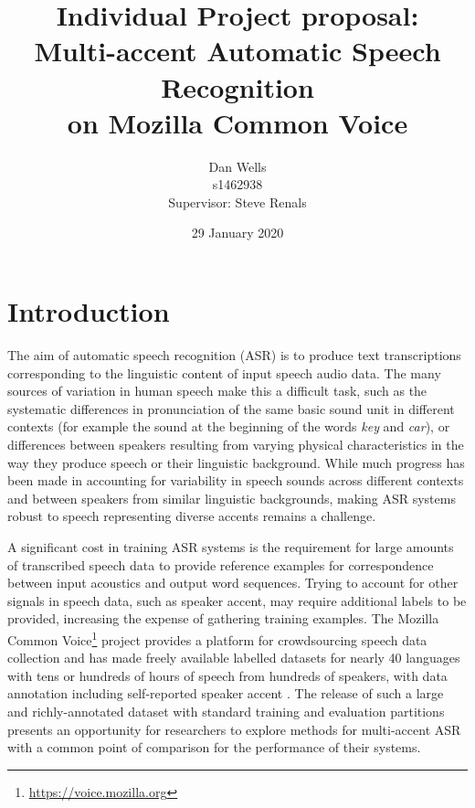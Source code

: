 \documentclass[a4paper]{article}
\begin{document}
\title{Individual Project proposal: \\ Multi-accent Automatic Speech Recognition \\ on Mozilla Common Voice}
\author{Dan Wells \\ s1462938 \\ Supervisor: Steve Renals}
\date{29 January 2020}
\maketitle


\section{Introduction}

The aim of automatic speech recognition (ASR) is to produce text transcriptions corresponding to the linguistic content of input speech audio data.
The many sources of variation in human speech make this a difficult task, such as the systematic differences in pronunciation of the same basic sound unit in different contexts (for example the sound at the beginning of the words \emph{key} and \emph{car}), or differences between speakers resulting from varying physical characteristics in the way they produce speech or their linguistic background.
While much progress has been made in accounting for variability in speech sounds across different contexts and between speakers from similar linguistic backgrounds, making ASR systems robust to speech representing diverse accents remains a challenge.

A significant cost in training ASR systems is the requirement for large amounts of transcribed speech data to provide reference examples for correspondence between input acoustics and output word sequences.
Trying to account for other signals in speech data, such as speaker accent, may require additional labels to be provided, increasing the expense of gathering training examples.
The Mozilla Common Voice\footnote{\url{https://voice.mozilla.org}} project provides a platform for crowdsourcing speech data collection and has made freely available labelled datasets for nearly 40 languages with tens or hundreds of hours of speech from hundreds of speakers, with data annotation including self-reported speaker accent \cite{ardila2019CommonVoiceMassivelyMultilingual}.
The release of such a large and richly-annotated dataset with standard training and evaluation partitions presents an opportunity for researchers to explore methods for multi-accent ASR with a common point of comparison for the performance of their systems.
\end{document}
